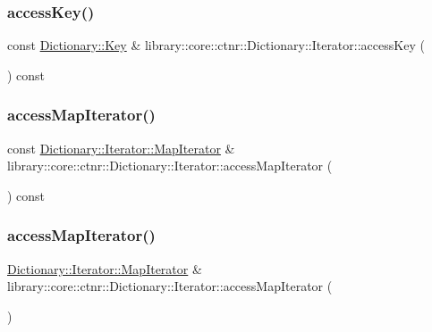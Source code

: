 \subsubsection{\texorpdfstring{access\+Key()}{accessKey()}}
{\footnotesize\ttfamily const \hyperlink{classlibrary_1_1core_1_1ctnr_1_1_dictionary_a987cae687cce70d81a2a483c5e05e842}{Dictionary\+::\+Key} \& library\+::core\+::ctnr\+::\+Dictionary\+::\+Iterator\+::access\+Key (\begin{DoxyParamCaption}{ }\end{DoxyParamCaption}) const}

\mbox{\label{classlibrary_1_1core_1_1ctnr_1_1_dictionary_1_1_iterator_ac6f24ef08aadc9db47e6b68678548465}} 
\subsubsection{\texorpdfstring{access\+Map\+Iterator()}{accessMapIterator()}\hspace{0.1cm}{\footnotesize\ttfamily [1/2]}}
{\footnotesize\ttfamily const \hyperlink{classlibrary_1_1core_1_1ctnr_1_1_dictionary_1_1_iterator_a990205e908ac1bafcd754993219b805e}{Dictionary\+::\+Iterator\+::\+Map\+Iterator} \& library\+::core\+::ctnr\+::\+Dictionary\+::\+Iterator\+::access\+Map\+Iterator (\begin{DoxyParamCaption}{ }\end{DoxyParamCaption}) const}

\mbox{\label{classlibrary_1_1core_1_1ctnr_1_1_dictionary_1_1_iterator_ad99c0605d7bcf97420bb6ac2d35fedd9}} 
\subsubsection{\texorpdfstring{access\+Map\+Iterator()}{accessMapIterator()}\hspace{0.1cm}{\footnotesize\ttfamily [2/2]}}
{\footnotesize\ttfamily \hyperlink{classlibrary_1_1core_1_1ctnr_1_1_dictionary_1_1_iterator_a990205e908ac1bafcd754993219b805e}{Dictionary\+::\+Iterator\+::\+Map\+Iterator} \& library\+::core\+::ctnr\+::\+Dictionary\+::\+Iterator\+::access\+Map\+Iterator (\begin{DoxyParamCaption}{ }\end{DoxyParamCaption})}

